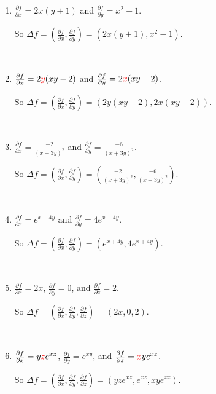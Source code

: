 \documentclass[11pt,fleqn]{book} %
\begin{document}
\begin{enumerate}
    \item 
    $\frac{\partial f}{\partial x} = 2x(y + 1)$ and 
    $\frac{\partial f}{\partial y} = x^2 - 1$. 
    
    So $\Delta f = \left( \frac{\partial f}{\partial x}, \frac{\partial f}{\partial y} \right) = (2x(y + 1), x^2 - 1)$. 

    {~~~}

    \item 
    $\frac{\partial f}{\partial x} = 2{\color{red}y}(xy - 2)$ and 
    $\frac{\partial f}{\partial y} = 2{\color{red}x}(xy - 2)$. 
    
    So $\Delta f = \left( \frac{\partial f}{\partial x}, \frac{\partial f}{\partial y} \right) = (2y(xy - 2), 2x(xy - 2))$. 

    {~~~}

    \item 
    $\frac{\partial f}{\partial x} = \frac{-2}{(x + 3y)^2}$ and 
    $\frac{\partial f}{\partial y} = \frac{-6}{(x + 3y)^2}$. 
    
    So $\Delta f = \left( \frac{\partial f}{\partial x}, \frac{\partial f}{\partial y} \right) = \left( \frac{-2}{(x + 3y)^2}, \frac{-6}{(x + 3y)^2} \right)$. 

    {~~~}

    \item 
    $\frac{\partial f}{\partial x} = e^{x + 4y}$ and 
    $\frac{\partial f}{\partial y} = 4e^{x + 4y}$. 
    
    So $\Delta f = \left( \frac{\partial f}{\partial x}, \frac{\partial f}{\partial y} \right) = (e^{x + 4y}, 4e^{x + 4y})$. 

    {~~~}

    \item 
    $\frac{\partial f}{\partial x} = 2x$, 
    $\frac{\partial f}{\partial y} = 0$, and
    $\frac{\partial f}{\partial z} = 2$. 
    
    So $\Delta f = \left( \frac{\partial f}{\partial x}, \frac{\partial f}{\partial y}, \frac{\partial f}{\partial z} \right) = (2x, 0, 2)$. 

    {~~~}

    \item 
    $\frac{\partial f}{\partial x} = y{\color{red}z}e^{xz}$, 
    $\frac{\partial f}{\partial y} = e^{xy}$, and
    $\frac{\partial f}{\partial z} = {\color{red}x}ye^{xz}$. 
    
    So $\Delta f = \left( \frac{\partial f}{\partial x}, \frac{\partial f}{\partial y}, \frac{\partial f}{\partial z} \right) = (yze^{xz}, e^{xz}, xye^{xz})$. 
\end{enumerate}
\end{document}
